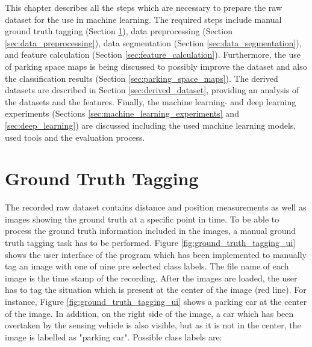 This chapter describes all the steps which are necessary to prepare the raw dataset for the use in machine learning. The required steps include manual ground truth tagging (Section \ref{sec:ground_truth_tagging}), data preprocessing (Section \ref{sec:data_preprocessing}), data segmentation (Section \ref{sec:data_segmentation}), and feature calculation (Section \ref{sec:feature_calculation}).
Furthermore, the use of parking space maps is being discussed to possibly improve the dataset and also the classification results (Section \ref{sec:parking_space_maps}). 
The derived datasets are described in Section \ref{sec:derived_dataset}, providing an analysis of the datasets and the features. 
Finally, the machine learning- and deep learning experiments (Sections \ref{sec:machine_learning_experiments} and \ref{sec:deep_learning}) are discussed including the used machine learning models, used tools and the evaluation process.





\section{Ground Truth Tagging}
\label{sec:ground_truth_tagging}

The recorded raw dataset contains distance and position measurements as well as images showing the ground truth at a specific point in time. To be able to process the ground truth information included in the images, a manual ground truth tagging task has to be performed. Figure \ref{fig:ground_truth_tagging_ui} shows the user interface of the program which has been implemented to manually tag an image with one of nine pre selected class labels. The file name of each image is the time stamp of the recording. After the images are loaded, the user has to tag the situation which is present at the center of the image (red line). For instance, Figure \ref{fig:ground_truth_tagging_ui} shows a parking car at the center of the image. In addition, on the right side of the image, a car which has been overtaken by the sensing vehicle is also visible, but as it is not in the center, the image is labelled as "parking car".
Possible class labels are: 

